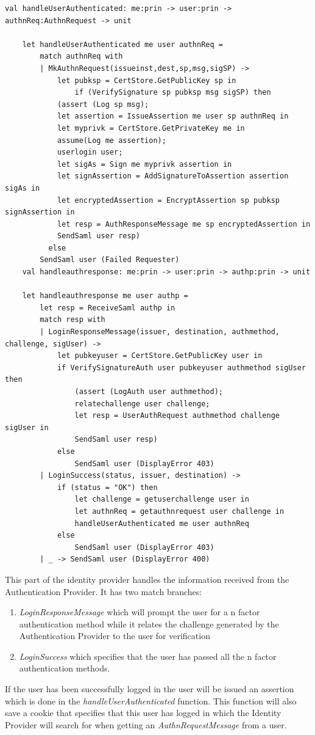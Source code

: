 \documentclass[twosided]{report}
\begin{document}
\begin{lstlisting}[style=fstar, caption={The handling of the responses from Authentication Provider}]
	val handleUserAuthenticated: me:prin -> user:prin -> authnReq:AuthnRequest -> unit

	let handleUserAuthenticated me user authnReq = 
		match authnReq with
		| MkAuthnRequest(issueinst,dest,sp,msg,sigSP) ->
			let pubksp = CertStore.GetPublicKey sp in
				if (VerifySignature sp pubksp msg sigSP) then
			(assert (Log sp msg);
			let assertion = IssueAssertion me user sp authnReq in
			let myprivk = CertStore.GetPrivateKey me in
			assume(Log me assertion);
			userlogin user;
			let sigAs = Sign me myprivk assertion in
			let signAssertion = AddSignatureToAssertion assertion sigAs in
			let encryptedAssertion = EncryptAssertion sp pubksp signAssertion in
			let resp = AuthResponseMessage me sp encryptedAssertion in
			SendSaml user resp)
	      else
		SendSaml user (Failed Requester)
	val handleauthresponse: me:prin -> user:prin -> authp:prin -> unit

	let handleauthresponse me user authp =
		let resp = ReceiveSaml authp in
		match resp with
		| LoginResponseMessage(issuer, destination, authmethod, challenge, sigUser) ->
			let pubkeyuser = CertStore.GetPublicKey user in
			if VerifySignatureAuth user pubkeyuser authmethod sigUser then
				(assert (LogAuth user authmethod);
				relatechallenge user challenge;
				let resp = UserAuthRequest authmethod challenge sigUser in
				SendSaml user resp)
			else
				SendSaml user (DisplayError 403)
		| LoginSuccess(status, issuer, destination) ->
			if (status = "OK") then
				let challenge = getuserchallenge user in
				let authnReq = getauthnrequest user challenge in
				handleUserAuthenticated me user authnReq
			else 
				SendSaml user (DisplayError 403)
		| _ -> SendSaml user (DisplayError 400)
\end{lstlisting}

This part of the identity provider handles the information received from the Authentication Provider. It has two match branches:
\begin{enumerate}
\item \emph{LoginResponseMessage} which will prompt the user for a n factor authentication method while it relates the challenge generated by the Authentication Provider to the user for verification
\item \emph{LoginSuccess} which specifies that the user has passed all the n factor authentication methods. 
\end{enumerate}
If the user has been successfully logged in the user will be issued an assertion which is done in the \emph{handleUserAuthenticated} function. This function will also save a cookie that specifies that this user has logged in which the Identity Provider will search for when getting an \emph{AuthnRequestMessage} from a user.
\end{document}
